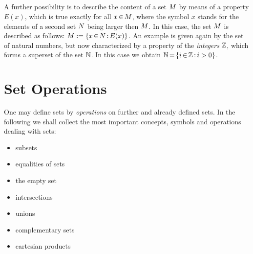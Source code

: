 \documentclass[11pt,twoside]{article}
\begin{document}
\subparagraph{}
A further possibility is 
to describe the content of a set $M$ by means of a property $E(x)$,
which is true exactly for all $x {\,\in\,} M$,
where the symbol $x$ stands for the elements of a second set $N$
being larger then $M$.
In this case,
the set $M$ is described as follows:
$M := \{x {\,\in\,} N {\,:\,} E(x)\}$.
An example is given again by the set of natural numbers,
but now characterized by a property of the \textit{integers} ${\mathbb{Z}}$,
which forms a superset of the set ${\mathbb{N}}$.
In this case we obtain ${\mathbb{N}} {\,=\,} \{i {\,\in\,} {\mathbb{Z}} {\,:\,} i > 0\}$. 

\section{Set Operations}
One may define sets by \textit{operations} on further and already defined sets.
In the following we shall collect the most important concepts, symbols
and operations dealing with sets:

\begin{itemize}[leftmargin=12mm]
\item subsets
\item equalities of sets
\item the empty set
\item intersections
\item unions
\item complementary sets
\item cartesian products
\end{itemize}
\end{document}
